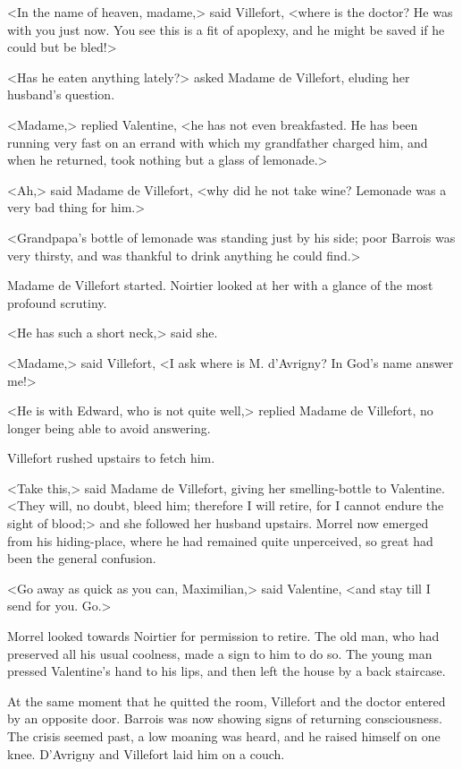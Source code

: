  <In the name of heaven, madame,> said Villefort, <where is the doctor? He was with you just now. You see this is a fit of apoplexy, and he might be saved if he could but be bled!> 

 <Has he eaten anything lately?> asked Madame de Villefort, eluding her husband's question. 

 <Madame,> replied Valentine, <he has not even breakfasted. He has been running very fast on an errand with which my grandfather charged him, and when he returned, took nothing but a glass of lemonade.> 

 <Ah,> said Madame de Villefort, <why did he not take wine? Lemonade was a very bad thing for him.> 

 <Grandpapa's bottle of lemonade was standing just by his side; poor Barrois was very thirsty, and was thankful to drink anything he could find.> 

 Madame de Villefort started. Noirtier looked at her with a glance of the most profound scrutiny. 

 <He has such a short neck,> said she. 

 <Madame,> said Villefort, <I ask where is M. d'Avrigny? In God's name answer me!> 

 <He is with Edward, who is not quite well,> replied Madame de Villefort, no longer being able to avoid answering. 

 Villefort rushed upstairs to fetch him. 

 <Take this,> said Madame de Villefort, giving her smelling-bottle to Valentine. <They will, no doubt, bleed him; therefore I will retire, for I cannot endure the sight of blood;> and she followed her husband upstairs. Morrel now emerged from his hiding-place, where he had remained quite unperceived, so great had been the general confusion. 

 <Go away as quick as you can, Maximilian,> said Valentine, <and stay till I send for you. Go.> 

 Morrel looked towards Noirtier for permission to retire. The old man, who had preserved all his usual coolness, made a sign to him to do so. The young man pressed Valentine's hand to his lips, and then left the house by a back staircase. 

 At the same moment that he quitted the room, Villefort and the doctor entered by an opposite door. Barrois was now showing signs of returning consciousness. The crisis seemed past, a low moaning was heard, and he raised himself on one knee. D'Avrigny and Villefort laid him on a couch. 

